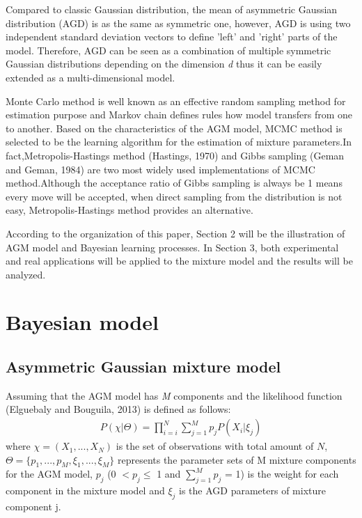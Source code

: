 \documentclass[conference]{IEEEtran}
\begin{document}
Compared to classic Gaussian distribution, the mean of asymmetric Gaussian distribution (AGD) is as the same as symmetric one, however, AGD is using two independent standard deviation vectors to define 'left' and 'right' parts of the model. Therefore, AGD can be seen as a combination of multiple symmetric Gaussian distributions depending on the dimension \textsl{d} thus it can be easily extended as a multi-dimensional model.

Monte Carlo method is well known as an effective random sampling method for estimation purpose and Markov chain defines rules how model transfers from one to another. Based on the characteristics of the AGM model, MCMC method is selected to be the learning algorithm for the estimation of mixture parameters.In fact,Metropolis-Hastings method (Hastings, 1970)\cite{b4} and Gibbs sampling (Geman and Geman, 1984)\cite{b5} are two most widely used implementations of MCMC method.Although the acceptance ratio of Gibbs sampling is always be 1 means every move will be accepted, when direct sampling from the distribution is not easy, Metropolis-Hastings method provides an alternative.

According to the organization of this paper, Section 2 will be the illustration of AGM model and Bayesian learning processes. In Section 3, both experimental and real applications will be applied to the mixture model and the results will be analyzed.


\section{Bayesian model}
\subsection{Asymmetric Gaussian mixture model}
Assuming that the AGM model has \textsl{M} components and the likelihood function (Elguebaly and Bouguila, 2013)\cite{b1} is defined as follows:
\begin{align}
P(\chi|\Theta) = \prod_{i=i}^N \sum_{j=1}^Mp_jP(X_i|\xi_j)
\label{eq:1}
\end{align}
where $\chi = (X_1,...,X_N)$ is the set of observations with total amount of $N$, $\Theta = \{p_1,...,p_M, \xi_1,...,\xi_M\}$ represents the parameter sets of M mixture components for the AGM model, $p_j$ (0 $< p_j \leq$ 1 and $\sum_{j=1}^Mp_j$ = 1) is the weight for each component in the mixture model and $\xi_j$ is the AGD parameters of mixture component j.
\end{document}
